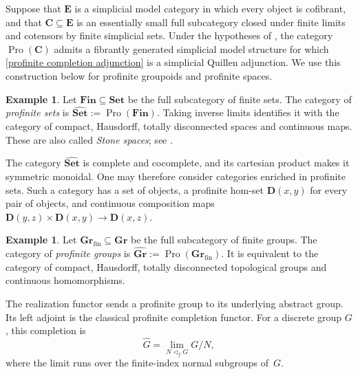 \documentclass{amsart}
\newcommand{\bC}{\mathbf{C}}
\newcommand{\bD}{\mathbf{D}}
\newcommand{\bE}{\mathbf{E}}
\newcommand{\Grp}{\mathbf{Gr}}
\newcommand{\Pro}{\operatorname{Pro}}
\theoremstyle{definition}
\newtheorem{example}[theorem]{Example}%
\numberwithin{equation}{section}
\begin{document}
Suppose that $\bE$ is a simplicial model category in which every
object is cofibrant, and that $\bC\subseteq\bE$ is an essentially
small full subcategory closed under finite limits and cotensors by
finite simplicial sets. Under the hypotheses of
\cite[Theorem~1.1]{BM20}, the category $\Pro(\bC)$ admits a
fibrantly generated simplicial model structure for which
\eqref{profinite completion adjunction} is a simplicial Quillen
adjunction. We use this construction below for profinite groupoids
and profinite spaces.

\begin{example}
\label{ex:profinite-sets}
Let $\mathbf{Fin}\subseteq\mathbf{Set}$ be the full subcategory of
finite sets. The category of \emph{profinite sets} is
$\widehat{\mathbf{Set}}:=\Pro(\mathbf{Fin})$. Taking inverse limits
identifies it with the category of compact, Hausdorff, totally
disconnected spaces and continuous maps. These are also called
\emph{Stone spaces}; see \cite[Chapter~VI]{Johnstone_stone_spaces}.

The category $\widehat{\mathbf{Set}}$ is complete and cocomplete, and
its cartesian product makes it symmetric monoidal. One may therefore
consider categories enriched in profinite sets. Such a category has
a set of objects, a profinite hom-set $\bD(x,y)$ for every pair of
objects, and continuous composition maps
$\bD(y,z)\times\bD(x,y)\to\bD(x,z)$.
\end{example}

\begin{example}
Let $\Grp_{\mathrm{fin}}\subseteq\Grp$ be the full subcategory of
finite groups. The category of \emph{profinite groups} is
$\widehat{\Grp}:=\Pro(\Grp_{\mathrm{fin}})$. It is equivalent to the
category of compact, Hausdorff, totally disconnected topological
groups and continuous homomorphisms.

The realization functor sends a profinite group to its underlying
abstract group. Its left adjoint is the classical profinite
completion functor. For a discrete group $G$, this completion is
\[
\widehat G
=
\lim_{N\triangleleft_fG}G/N,
\]
where the limit runs over the finite-index normal subgroups of~$G$.
\end{example}
\end{document}
